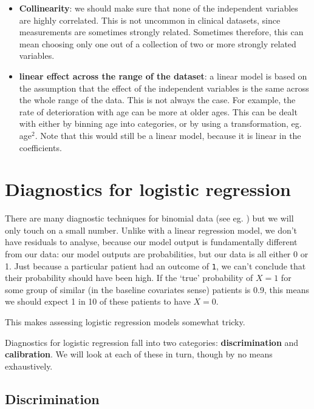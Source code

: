 \documentclass[
  openany]{book}
\providecommand{\tightlist}{%
  \setlength{\itemsep}{0pt}\setlength{\parskip}{0pt}}
\theoremstyle{definition}
\theoremstyle{definition}
\theoremstyle{definition}
\theoremstyle{definition}
\theoremstyle{remark}
\begin{document}
\begin{itemize}
\tightlist
\item
  \textbf{Collinearity}: we should make sure that none of the independent variables are highly correlated. This is not uncommon in clinical datasets, since measurements are sometimes strongly related. Sometimes therefore, this can mean choosing only one out of a collection of two or more strongly related variables.
\item
  \textbf{linear effect across the range of the dataset}: a linear model is based on the assumption that the effect of the independent variables is the same across the whole range of the data. This is not always the case. For example, the rate of deterioration with age can be more at older ages. This can be dealt with either by binning age into categories, or by using a transformation, eg. age\(^2\). Note that this would still be a linear model, because it is linear in the coefficients.
\end{itemize}

\section{Diagnostics for logistic regression}\label{diaglogreg}

There are many diagnostic techniques for binomial data (see eg. \citet{collett_bin}) but we will only touch on a small number. Unlike with a linear regression model, we don't have residuals to analyse, because our model output is fundamentally different from our data: our model outputs are probabilities, but our data is all either 0 or 1. Just because a particular patient had an outcome of \texttt{1}, we can't conclude that their probability should have been high. If the `true' probability of \(X=1\) for some group of similar (in the baseline covariates sense) patients is 0.9, this means we should expect 1 in 10 of these patients to have \(X=0\).

This makes assessing logistic regression models somewhat tricky.

Diagnostics for logistic regression fall into two categories: \textbf{discrimination} and \textbf{calibration}. We will look at each of these in turn, though by no means exhaustively.

\subsection{Discrimination}\label{discrimination}
\end{document}
